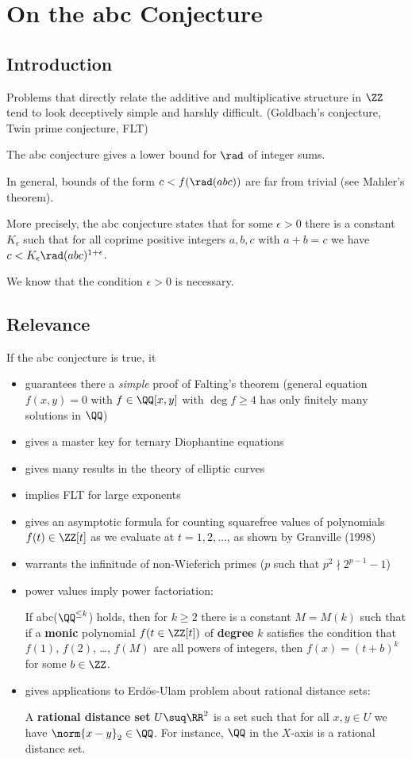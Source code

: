 \documentclass[11pt]{scrartcl}
\begin{document}
\section{On the abc Conjecture}
\subsection{Introduction}

Problems that directly relate the additive and multiplicative structure in $\ZZ$ tend to look deceptively simple and harshly difficult. (Goldbach's conjecture, Twin prime conjecture, FLT)

The abc conjecture gives a lower bound for $\rad$ of integer sums.

In general, bounds of the form $c < f(\rad(abc))$ are far from trivial
(see Mahler's theorem).

More precisely, the abc conjecture states that for some $\epsilon >0$
there is a constant $K_{\epsilon}$ such that for all coprime positive
integers $a, b, c$ with $a+b = c$ we have
$c < K_{\epsilon}\rad(abc)^{1+\epsilon}$.

We know that the condition $\epsilon > 0$ is necessary.


\subsection{Relevance}
If the abc conjecture is true, it
\begin{itemize}
\item guarantees there  a \textit{simple} proof
  of Falting's theorem (general equation $f(x, y) = 0$ with $f\in \QQ[x, y]$ with $\deg f \geq 4$ has only finitely many solutions in $\QQ$)
\item gives a master key for ternary Diophantine equations
\item gives many results in the theory of elliptic curves
\item implies FLT for large exponents
\item gives an asymptotic formula for counting squarefree values of polynomials $f(t)\in \ZZ[t]$ as we evaluate at $t=1, 2, \dots$, as shown by Granville (1998)
\item warrants the infinitude of non-Wieferich primes ($p$ such that $p^2\nmid 2^{p-1} - 1$)
\item power values imply power factoriation:

  If abc($\QQ^{\leq k}$) holds, then for $k\geq 2$ there is a constant
  $M = M(k)$ such that if a \textbf{monic} polynomial $f(t\in \ZZ[t])$
  of \textbf{degree} $k$ satisfies the condition that $f(1)$, $f(2)$,
  \dots, $f(M)$ are all powers of integers, then $f(x) = (t+b)^k$ for
  some $b\in\ZZ$.
\item gives applications to Erd\"os-Ulam problem about rational
  distance sets:

  A \textbf{rational distance set} $U\suq \RR^2$ is a set such that
  for all $x, y \in U$ we have $\norm{x-y}_2\in \QQ$. For instance,
  $\QQ$ in the $X$-axis is a rational distance set.


\end{itemize}
\end{document}
